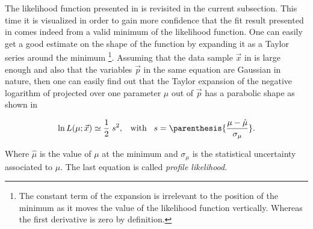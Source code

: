 The likelihood function presented in  is revisited in the current subsection.
This time it is visualized in order to gain more confidence that the fit result presented in 
comes indeed from a valid minimum of the likelihood function. One can easily get a good estimate on the shape of the function
by expanding it as a Taylor series around the 
minimum \footnote{The constant term of the
expansion is irrelevant to the position of the minimum as it moves the value of the likelihood function vertically. Whereas
the first derivative is zero by definition.}. Assuming that the data sample $\vec{x}$ in  is large enough
and also that the variables $\vec{p}$ in the same equation are Gaussian in nature, then one can easily find out that the 
Taylor expansion of the negative logarithm of  projected over one parameter $\mu$ out of $\vec{p}$ has a
parabolic shape as shown in 
 
\begin{equation}
\ln L(\mu;\vec{x}) \simeq \frac{1}{2} \; s^2, \;\;\; \text{with} \;\;\; s = \parenthesis{\frac{\mu-\hat{\mu}}{\sigma_{\mu}}}.
\label{likelihood_exp}
\end{equation}

\noindent Where $\hat{\mu}$ is the value of $\mu$ at the minimum and $\sigma_{\mu}$ is the statistical uncertainty associated
to $\mu$. The last equation is called {\it profile likelihood}.

